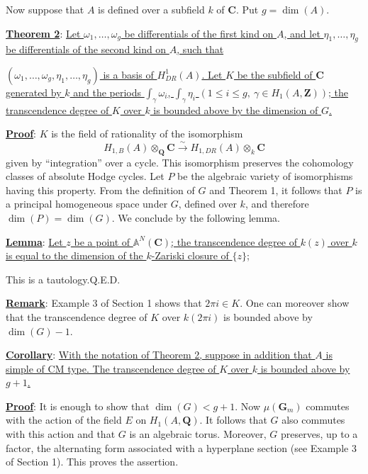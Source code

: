 \documentclass[10pt,a4paper]{article}
\newcommand{\Z}{\mathbf Z}
\newcommand{\Q}{\mathbf Q}
\newcommand{\C}{\mathbf C}
\newcommand{\Gm}{\mathbf G_m}
\begin{document}
Now suppose that $A$ is defined over a subfield $k$ of $\C$. Put $g=\dim(A)$.

\noindent\uline{\textbf{Theorem 2}}: \uline{Let $\omega_1,\ldots,\omega_g$ be differentials of the first kind on $A$, and let $\eta_1,\ldots,\eta_g$ be differentials of the second kind on $A$, such that}


\newpage


\uline{$(\omega_1,\ldots,\omega_g,\eta_1,\ldots,\eta_g)$ is a basis of $H^1_{DR}(A)$. Let $K$ be the subfield of $\C$ generated by $k$ and the periods $\int_\gamma\omega_i$, $\int_\gamma\eta_i$ $(1\le i\le g,\ \gamma\in H_1(A,\Z))$; the transcendence degree of $K$ over $k$ is bounded above by the dimension of $G$.}

\noindent\uline{\textbf{Proof}}: $K$ is the field of rationality of the isomorphism
\[
H_{1,B}(A)\otimes_{\Q}\C\xrightarrow{\sim}H_{1,DR}(A)\otimes_k\C
\]
given by ``integration'' over a cycle. This isomorphism preserves the cohomology classes of absolute Hodge cycles. Let $P$ be the algebraic variety of isomorphisms having this property. From the definition of $G$ and Theorem 1, it follows that $P$ is a principal homogeneous space under $G$, defined over $k$, and therefore $\dim(P)=\dim(G)$. We conclude by the following lemma.

\noindent\uline{\textbf{Lemma}}: \uline{Let $z$ be a point of $\mathbb A^N(\C)$; the transcendence degree of $k(z)$ over $k$ is equal to the dimension of the $k$-Zariski closure of $\{z\}$;}

\begin{center}This is a tautology.\hfill Q.E.D.\end{center}

\noindent\uline{\textbf{Remark}}: Example 3 of Section 1 shows that $2\pi i\in K$. One can moreover show that the transcendence degree of $K$ over $k(2\pi i)$ is bounded above by $\dim(G)-1$.

\noindent\uline{\textbf{Corollary}}: \uline{With the notation of Theorem 2, suppose in addition that $A$ is simple of CM type. The transcendence degree of $K$ over $k$ is bounded above by $g+1$.}

\noindent\uline{\textbf{Proof}}: It is enough to show that $\dim(G)<g+1$. Now $\mu(\Gm)$ commutes with the action of the field $E$ on $H_1(A,\Q)$. It follows that $G$ also commutes with this action and that $G$ is an algebraic torus. Moreover, $G$ preserves, up to a factor, the alternating form associated with a hyperplane section (see Example 3 of Section 1). This proves the assertion.
\end{document}
